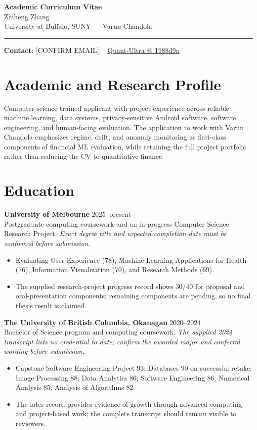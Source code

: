 \documentclass[11pt]{article}
\makeatletter
\newcommand{\ApplicantName}{Zhiheng Zhang}
\newcommand{\ApplicantEmail}{[CONFIRM EMAIL]}
\newcommand{\ApplicantPhone}{[CONFIRM PHONE]}
\newcommand{\ApplicantGitHub}{\href{https://github.com/zhiheng-zhang-Mera/Quant-Ultra/tree/1988d9a8530da91a8158de864d098ea869098923}{Quant-Ultra @ 1988d9a}}
\makeatother
\begin{document}
\begin{center}
{\LARGE\bfseries Academic Curriculum Vitae}\\[0.25em]
{\large \ApplicantName}\\
University at Buffalo, SUNY --- Varun Chandola
\end{center}
\vspace{0.35em}\hrule\vspace{0.65em}

\textbf{Contact}: \ApplicantEmail\quad | \quad \ApplicantPhone\quad | \quad \ApplicantGitHub

\section*{Academic and Research Profile}
Computer-science-trained applicant with project experience across reliable machine learning, data systems, privacy-sensitive Android software, software engineering, and human-facing evaluation. The application to work with Varun Chandola emphasizes regime, drift, and anomaly monitoring as first-class components of financial ML evaluation, while retaining the full project portfolio rather than reducing the CV to quantitative finance.

\section*{Education}
\textbf{University of Melbourne} \hfill 2025--present\\
Postgraduate computing coursework and an in-progress Computer Science Research Project. \textit{Exact degree title and expected completion date must be confirmed before submission.}
\begin{itemize}
\item Evaluating User Experience (78), Machine Learning Applications for Health (76), Information Visualization (70), and Research Methods (69).
\item The supplied research-project progress record shows 30/40 for proposal and oral-presentation components; remaining components are pending, so no final thesis result is claimed.
\end{itemize}

\textbf{The University of British Columbia, Okanagan} \hfill 2020--2024\\
Bachelor of Science program and computing coursework. \textit{The supplied 2024 transcript lists no credential to date; confirm the awarded major and conferral wording before submission.}
\begin{itemize}
\item Capstone Software Engineering Project 93; Databases 90 on successful retake; Image Processing 88; Data Analytics 86; Software Engineering 86; Numerical Analysis 85; Analysis of Algorithms 82.
\item The later record provides evidence of growth through advanced computing and project-based work; the complete transcript should remain visible to reviewers.
\end{itemize}
\end{document}
